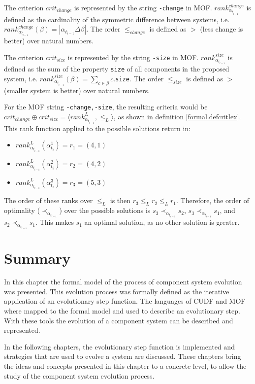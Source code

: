 The criterion $crit_{change}$ is represented by the string \verb+-change+ in MOF.
$rank^{change}_{\alpha_{t_{i-1}}}$ is defined as the cardinality of the symmetric difference between systems, i.e. $rank^{change}_{\alpha_{t_{i-1}}}(\beta) = |\alpha_{t_{i-1}} \Delta \beta|$.
The order $\leq_{change}$ is defined as $>$ (less change is better) over natural numbers. 

The criterion $crit_{size}$ is represented by the string \verb+-size+ in MOF.
$rank^{size}_{\alpha_{t_{i-1}}}$ is defined as the sum of the property \verb+size+ of all components in the  proposed system, i.e. $rank^{size}_{\alpha_{t_{i-1}}}(\beta) = \sum_{c \in \beta} c$.\verb+size+.
The order $\leq_{size}$ is defined as $>$ (smaller system is better) over natural numbers. 

For the MOF string \verb+-change,-size+, the resulting criteria would be $crit_{change} \oplus crit_{size} = \langle rank^{L}_{\alpha_{t_{i-1}}}, \leq_L \rangle$, as shown in definition \ref{formal.defcritlex}.
This rank function applied to the possible solutions return in:
\begin{itemize}
  \item $rank^{L}_{\alpha_{t_{i-1}}}(\alpha_{t_i}^1 ) = r_1 = (4, 1)$
  \item $rank^{L}_{\alpha_{t_{i-1}}}(\alpha_{t_i}^2 ) = r_2 = (4, 2)$
  \item $rank^{L}_{\alpha_{t_{i-1}}}(\alpha_{t_i}^3 ) = r_3 = (5, 3)$
\end{itemize}
The order of these ranks over $\leq_L$ is then $r_3 \leq_L r_2 \leq_L r_1$.
Therefore, the order of optimality ($\prec_{\alpha_{t_{i-1}}}$) over the possible solutions is $s_3 \prec_{\alpha_{t_{i-1}}} s_2$, $s_3 \prec_{\alpha_{t_{i-1}}} s_1$, and $s_2 \prec_{\alpha_{t_{i-1}}} s_1$.
This makes $s_1$ an optimal solution, as no other solution is greater. 

\section{Summary}
In this chapter the formal model of the process of component system evolution was presented.
This evolution process was formally defined as the iterative application of an evolutionary step function.
The languages of CUDF and MOF where mapped to the formal model and used to describe an evolutionary step.
With these tools the evolution of a component system can be described and represented.

In the following chapters, the evolutionary step function is implemented and strategies that are used to evolve a system are discussed.
These chapters bring the ideas and concepts presented in this chapter to a concrete level, to allow the study of the component system evolution process.
